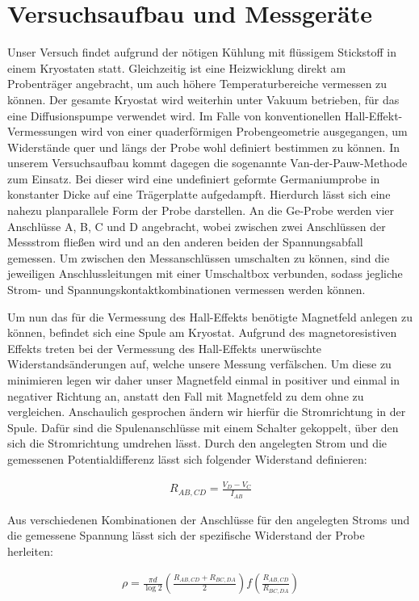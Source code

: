 \section{Versuchsaufbau und Messgeräte}
Unser Versuch findet aufgrund der nötigen Kühlung mit flüssigem Stickstoff in einem Kryostaten statt. Gleichzeitig ist eine Heizwicklung direkt am Probenträger angebracht, um auch höhere Temperaturbereiche vermessen zu können. Der gesamte Kryostat wird weiterhin unter Vakuum betrieben, für das eine Diffusionspumpe verwendet wird. Im Falle von konventionellen Hall-Effekt-Vermessungen wird von einer quaderförmigen Probengeometrie ausgegangen, um Widerstände quer und längs der Probe wohl definiert bestimmen zu können. In unserem Versuchsaufbau kommt dagegen die sogenannte Van-der-Pauw-Methode zum Einsatz. Bei dieser wird eine undefiniert geformte Germaniumprobe in konstanter Dicke auf eine Trägerplatte aufgedampft. Hierdurch lässt sich eine nahezu planparallele Form der Probe darstellen. An die Ge-Probe werden vier Anschlüsse A, B, C und D angebracht, wobei zwischen zwei Anschlüssen der Messstrom fließen wird und an den anderen beiden der Spannungsabfall gemessen. Um zwischen den Messanschlüssen umschalten zu können, sind die jeweiligen Anschlussleitungen mit einer Umschaltbox verbunden, sodass jegliche Strom- und Spannungskontaktkombinationen vermessen werden können. 

Um nun das für die Vermessung des Hall-Effekts benötigte Magnetfeld anlegen zu können, befindet sich eine Spule am Kryostat. Aufgrund des magnetoresistiven Effekts treten bei der Vermessung des Hall-Effekts unerwüschte Widerstandsänderungen auf, welche unsere Messung verfälschen. Um diese zu minimieren legen wir daher unser Magnetfeld einmal in positiver und einmal in negativer Richtung an, anstatt den Fall mit Magnetfeld zu dem ohne zu vergleichen. Anschaulich gesprochen ändern wir hierfür die Stromrichtung in der Spule. Dafür sind die Spulenanschlüsse mit einem Schalter gekoppelt, über den sich die Stromrichtung umdrehen lässt. Durch den angelegten Strom und die gemessenen Potentialdifferenz lässt sich folgender Widerstand definieren:

\begin{align}
R_{AB,CD}= \frac{V_D -V_C}{I_{AB}}
\end{align}

Aus verschiedenen Kombinationen der Anschlüsse für den angelegten Stroms und die gemessene Spannung lässt sich der spezifische Widerstand der Probe herleiten:

\begin{align}
\rho = \frac{\pi d}{\log{2}}\left(\frac{R_{AB,CD}+R_{BC,DA}}{2}\right)f\left(\frac{R_{AB,CD}}{R_{BC,DA}}\right)
\end{align}

